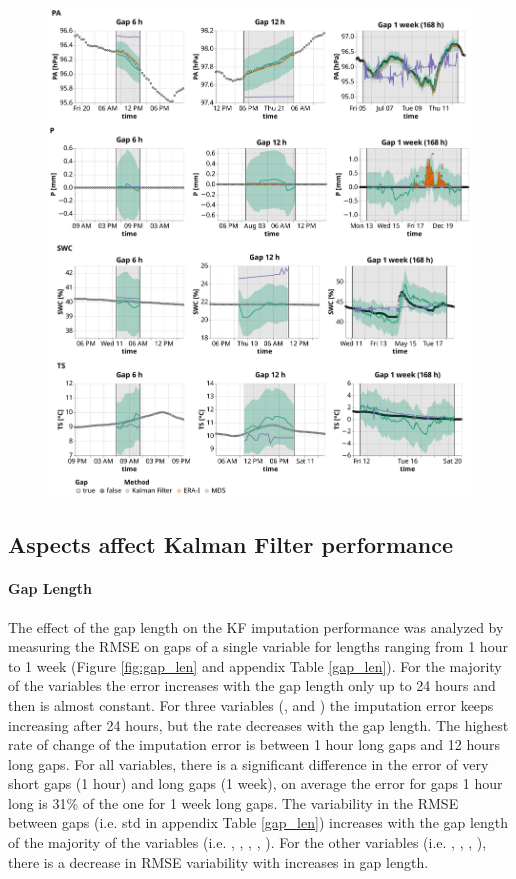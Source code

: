 \documentclass{article}
\let\Oldsubsection\subsection
\renewcommand{\subsection}{\FloatBarrier\Oldsubsection}
\begin{document}
\begin{figure}
\centerline{\includegraphics[width=5.7in]{timeseries_2}}
\caption{}
\label{fig:ts_1-2}
\end{figure}
\restoregeometry


\subsection{Aspects affect Kalman Filter performance}

\paragraph{Gap Length} The effect of the gap length on the KF imputation performance was analyzed by measuring the RMSE on gaps of a single variable for lengths ranging from 1 hour to 1 week (Figure \ref{fig:gap_len} and appendix Table \ref{gap_len}). For the majority of the variables the error increases with the gap length only up to 24 hours and then is almost constant. For three variables (,  and ) the imputation error keeps increasing after 24 hours, but the rate decreases with the gap length. The highest rate of change of the imputation error is between 1 hour long gaps and 12 hours long gaps.
For all variables, there is a significant difference in the error of very short gaps (1 hour) and long gaps (1 week), on average the error for gaps 1 hour long is 31\% of the one for 1 week long gaps.
The variability in the RMSE between gaps (i.e. std in appendix Table \ref{gap_len}) increases with the gap length of the majority of the variables (i.e. , , , , ). For the other variables (i.e. , , , ), there is a decrease in RMSE variability with increases in gap length.
\end{document}
